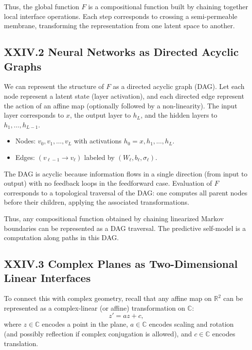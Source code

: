 \documentclass[12pt,letterpaper]{article}
\begin{document}
Thus, the global function $F$ is a compositional function built by chaining together local interface operations. Each step corresponds to crossing a semi-permeable membrane, transforming the representation from one latent space to another.

\subsection{XXIV.2 Neural Networks as Directed Acyclic Graphs}

We can represent the structure of $F$ as a directed acyclic graph (DAG). Let each node represent a latent state (layer activation), and each directed edge represent the action of an affine map (optionally followed by a non-linearity). The input layer corresponds to $x$, the output layer to $h_L$, and the hidden layers to $h_1, \dots, h_{L-1}$.

\begin{itemize}
    \item Nodes: $v_0, v_1, \dots, v_L$ with activations $h_0 = x, h_1, \dots, h_L$.
    \item Edges: $(v_{\ell-1} \to v_\ell)$ labeled by $(W_\ell, b_\ell, \sigma_\ell)$.
\end{itemize}

The DAG is acyclic because information flows in a single direction (from input to output) with no feedback loops in the feedforward case. Evaluation of $F$ corresponds to a topological traversal of the DAG: one computes all parent nodes before their children, applying the associated transformations.

Thus, any compositional function obtained by chaining linearized Markov boundaries can be represented as a DAG traversal. The predictive self-model is a computation along paths in this DAG.

\subsection{XXIV.3 Complex Planes as Two-Dimensional Linear Interfaces}

To connect this with complex geometry, recall that any affine map on $\mathbb{R}^2$ can be represented as a complex-linear (or affine) transformation on $\mathbb{C}$:
\[
z' = a z + c,
\]
where $z \in \mathbb{C}$ encodes a point in the plane, $a \in \mathbb{C}$ encodes scaling and rotation (and possibly reflection if complex conjugation is allowed), and $c \in \mathbb{C}$ encodes translation.
\end{document}
